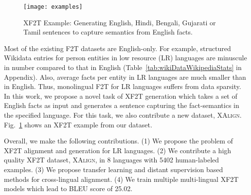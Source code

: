 \documentclass[11pt]{article}
\def\langCount{8}
\def\goldenCount{5402} %
\begin{document}
\begin{figure}[h!]
    \centering
    \texttt{[image: examples]}
    \caption{XF2T Example: Generating English, Hindi, Bengali, Gujarati or Tamil sentences to capture semantics from English facts.}
    \label{fig:examples}
\end{figure}

Most of the existing F2T datasets are English-only. For example, structured Wikidata entries for person entities in low resource (LR) languages are minuscule in number compared to that in English (Table~\ref{tab:wikiDataWikipediaStats} in Appendix). Also, average facts per entity in LR languages are much smaller than in English. Thus, monolingual F2T for LR languages suffers from data sparsity. In this work, we propose a novel task of XF2T generation which takes a set of English facts as input and generates a sentence capturing the fact-semantics in the specified language. For this task, we also contribute a new dataset, \textsc{XAlign}. Fig.~\ref{fig:examples} shows an XF2T example from our dataset. 




Overall, we make the following contributions. (1) We propose the problem of XF2T alignment and generation for LR languages. (2) We contribute a high quality XF2T dataset, \textsc{XAlign}, in \langCount{} languages with \goldenCount{} human-labeled examples. (3) We propose transfer learning and distant supervision based methods for cross-lingual alignment. (4) We train multiple multi-lingual XF2T models which lead to BLEU score of 25.02.
\end{document}
